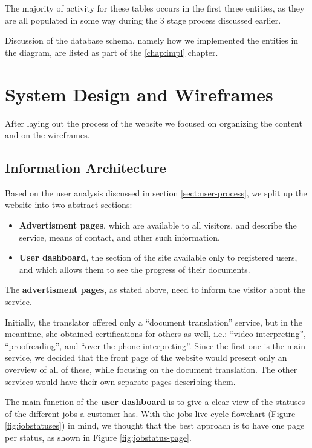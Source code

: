 \documentclass{l3proj}
\begin{document}
The majority of activity for these tables occurs in the first three entities, as they are all populated 
in some way during the 3 stage process discussed earlier.

Discussion of the database schema, namely how we implemented the entities in the diagram, are listed as part of the \ref{chap:impl} chapter.


\section{System Design and Wireframes}
\label{sect:system-design-and-wireframes}
After laying out the process of the website we focused on organizing the content
and on the wireframes.


\subsection{Information Architecture}
Based on the user analysis discussed in section \ref{sect:user-process}, we split
up the website into two abstract sections: 
\begin{itemize} 
	\item \textbf{Advertisment pages}, which are available to all visitors, and
	describe the service, means of contact, and other such information.
	\item \textbf{User dashboard}, the section of the site available only to
	registered users, and which allows them to see the progress of their 
	documents.
\end{itemize}

The \textbf{advertisment pages}, as stated above, need to inform the visitor
about the service. 

Initially, the translator offered only a ``document translation'' service, but
in the meantime, she obtained certifications for others as well, i.e.:
``video interpreting'', ``proofreading'', and ``over-the-phone interpreting''.
Since the first one is the main service, we decided that the front page of the
website would present only an overview of all of these, while focusing on the
document translation. The other services would have their own separate pages
describing them.

The main function of the \textbf{user dashboard} is to give a clear view of
the statuses of the different jobs a customer has. With the jobs live-cycle
flowchart (Figure \ref{fig:jobstatuses}) in mind, we thought that the best
approach is to have one page per status, as shown in Figure 
\ref{fig:jobstatus-page}.
\end{document}
